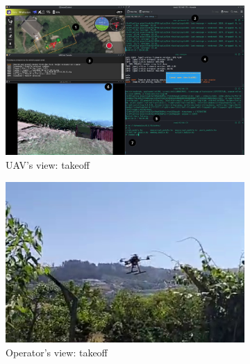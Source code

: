\begin{figure}[!hbt]
  \centering
  \begin{subfigure}[t]{\textwidth}
    \centering
    \includegraphics[width=1.0\textwidth]{./img/png/bao-fpv-insmod-1} 
    \caption{UAV's view: takeoff}%
    \label{fig:mission-exec-sspfs-takeoff-1}
  \end{subfigure}
%  
  \begin{subfigure}[t]{0.49\textwidth}
    \centering
    \includegraphics[width=\linewidth]{./img/png/bao-flight-myView-takeoff} %
    \caption{Operator's view: takeoff}%
    \label{fig:mission-exec-sspfs-takeoff-2}
  \end{subfigure}
  \begin{subfigure}[t]{0.49\textwidth}
    \centering

\end{subfigure}
\end{figure}
